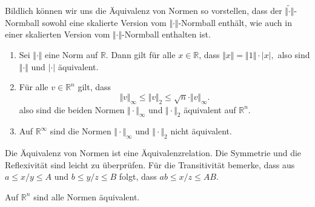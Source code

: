 \documentclass[../main.tex]{subfiles}
\begin{document}
Bildlich können wir uns die Äquivalenz von Normen so vorstellen,
dass der $\widetilde{\Vert \cdot \Vert}$-Normball
sowohl eine skalierte Version vom $\Vert \cdot \Vert$-Normball
enthält, wie auch in einer skalierten Version
vom $\Vert \cdot \Vert$-Normball enthalten ist.

\begin{examples}
  \leavevmode
  \begin{enumerate}[(1)]
    \item Sei $\Vert \cdot \Vert$ eine Norm auf $\mathbb{R}$.
      Dann gilt für alle $x \in \mathbb{R}$, dass
      \(
        \Vert x \Vert = \Vert 1 \Vert \cdot |x|,
      \)
      also sind $\Vert \cdot \Vert$ und $| \cdot |$ äquivalent.
    \item
      Für alle $v \in \mathbb{R}^n$ gilt, dass
      \[
        \Vert v \Vert_{\infty} \leq \Vert v \Vert_2
        \leq \sqrt{n} \cdot \Vert v \Vert_{\infty}.
      \]
      also sind die beiden Normen
      $\Vert \cdot \Vert_{\infty}$ und $\Vert \cdot \Vert_2$ 
      äquivalent auf $\mathbb{R}^{n}$.
    \item Auf $\mathbb{R}^{\infty}$ sind die Normen
      $\Vert \cdot \Vert_{\infty}$ und $\Vert \cdot \Vert_{2}$ 
      nicht äquivalent.
  \end{enumerate}
\end{examples}

\begin{remark}
  Die Äquivalenz von Normen ist eine Äquivalenzrelation.
  Die Symmetrie und die Reflexivität sind leicht zu überprüfen.
  Für die Transitivität bemerke, dass
  aus $a \leq x/y \leq A$ und $b \leq y/z \leq B$ folgt,
  dass $ab \leq x/z \leq AB$.
\end{remark}

\begin{theorem*}
  Auf $\mathbb{R}^n$ sind alle Normen äquivalent.
\end{theorem*}
\end{document}
